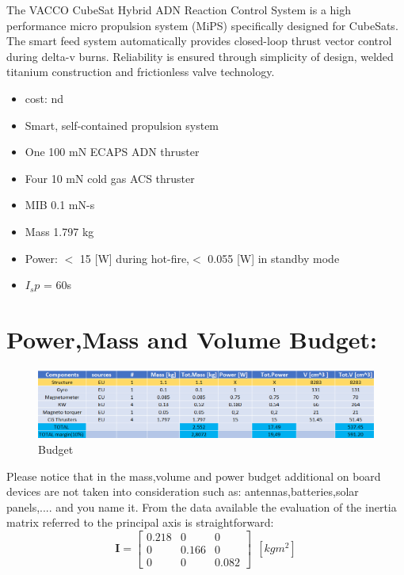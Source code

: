 \documentclass[11pt]{article}
\begin{document}
The  VACCO   CubeSat  Hybrid  ADN
 Reaction  Control  System  is  a  high
performance  micro  propulsion  system  (MiPS)
specifically designed for CubeSats. The smart feed system automatically provides closed-loop thrust vector control during delta-v burns. Reliability is ensured through simplicity of design, welded titanium construction and frictionless valve technology.
\begin{multicols}{2}
\begin{itemize}
\item cost: nd
\item Smart, self-contained propulsion system
\item One 100 mN ECAPS ADN thruster
\item Four 10 mN cold gas ACS thruster
\item MIB  0.1 mN-s
\item Mass 1.797 kg
\item Power: $<$ 15 [W] during hot-fire,$<$ 0.055 [W] in
standby mode
\item $I_sp$ = 60s
\end{itemize}
\end{multicols}


\section{Power,Mass and Volume Budget:}
\begin{figure} [H]

\centering 

\includegraphics[scale=0.78]{table.PNG}


\caption{Budget}

\end{figure}
Please notice that in the mass,volume and power budget additional on board devices are not taken into consideration  such as: antennas,batteries,solar panels,.... and you name it. 
From the data available the evaluation of the inertia matrix referred to the principal axis is straightforward:
\begin{equation}
\mathbf{I}=
\begin{bmatrix}                   
0.218&0&0\\
0&0.166&0\\
0&0&0.082
\end{bmatrix} \ \ [kgm^2]
\end{equation}
\clearpage
\end{document}

